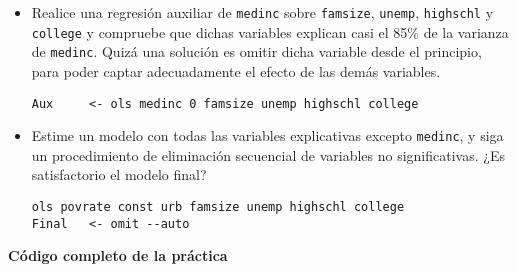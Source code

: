 \documentclass[11pt]{article}
\begin{document}
\begin{itemize}
\item Realice una regresión auxiliar de \texttt{medinc} sobre \texttt{famsize}, \texttt{unemp},
\texttt{highschl} y \texttt{college} y compruebe que dichas variables explican
casi el 85\% de la varianza de \texttt{medinc}. Quizá una solución es omitir
dicha variable desde el principio, para poder captar adecuadamente
el efecto de las demás variables.
{\vspace{0pt} \color{gray!70!black}
\begin{verbatim}
Aux     <- ols medinc 0 famsize unemp highschl college
\end{verbatim}
}

\item Estime un modelo con todas las variables explicativas excepto
\texttt{medinc}, y siga un procedimiento de eliminación secuencial de
variables no significativas. ¿Es satisfactorio el modelo final?
{\vspace{0pt} \color{gray!70!black}
\begin{verbatim}
ols povrate const urb famsize unemp highschl college
Final   <- omit --auto
\end{verbatim}
}
\end{itemize}


\vspace{10pt}
\noindent
\textbf{Código completo de la práctica}
\vspace{10pt}

\clearpage
\end{document}
